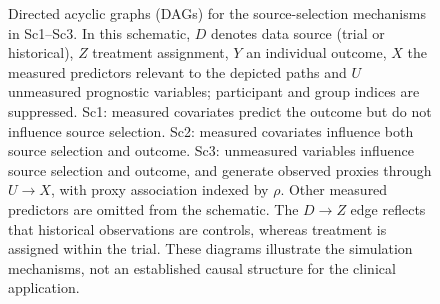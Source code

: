 \begin{figure}[p]
{\begin{tikzpicture}
\end{tikzpicture}}
\caption{Directed acyclic graphs (DAGs) for the source-selection mechanisms in Sc1--Sc3. In this schematic, $D$ denotes data source (trial or historical), $Z$ treatment assignment, $Y$ an individual outcome, $X$ the measured predictors relevant to the depicted paths and $U$ unmeasured prognostic variables; participant and group indices are suppressed. Sc1: measured covariates predict the outcome but do not influence source selection. Sc2: measured covariates influence both source selection and outcome. Sc3: unmeasured variables influence source selection and outcome, and generate observed proxies through $U\to X$, with proxy association indexed by $\rho$. Other measured predictors are omitted from the schematic. The $D\to Z$ edge reflects that historical observations are controls, whereas treatment is assigned within the trial. These diagrams illustrate the simulation mechanisms, not an established causal structure for the clinical application.}
\label{fig:dag_scenarios}
\end{figure}
